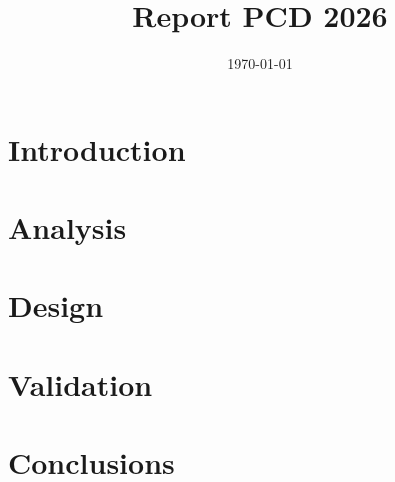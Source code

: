 \documentclass[11pt,a4paper]{article}
\title{Report PCD 2026}
\author{}
\date{\today}
\begin{document}
\maketitle

\section{Introduction}




\section{Analysis}


\section{Design}


\section{Validation}


\section{Conclusions}

\end{document}
